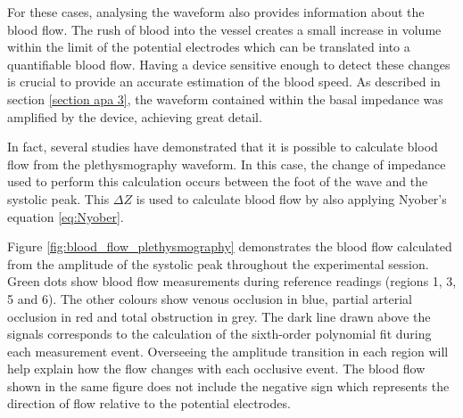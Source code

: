 For these cases, analysing the waveform also provides information about the blood flow.  The rush of blood into the vessel creates a small increase in volume within the limit of the potential electrodes which can be translated into a quantifiable blood flow. Having a device sensitive enough to detect these changes is crucial to provide an accurate estimation of the blood speed. As described in section \ref{section apa 3}, the waveform contained within the basal impedance was amplified by the device, achieving great detail. 

In fact, several studies  have demonstrated that it is possible to calculate blood flow from the plethysmography waveform. In this case, the change of impedance used to perform this calculation occurs between the foot of the wave and the systolic peak. This $\Delta Z$ is used to calculate blood flow by also applying Nyober's equation \ref{eq:Nyober}. 

Figure \ref{fig:blood_flow_plethysmography} demonstrates the blood flow calculated from the amplitude of the systolic peak throughout the experimental session. Green dots show blood flow measurements during reference readings (regions 1, 3, 5 and 6). The other colours show venous occlusion in blue, partial arterial occlusion in red and total obstruction in grey. The dark line drawn above the signals corresponds to the calculation of the sixth-order polynomial fit during each measurement event. Overseeing the amplitude transition in each region will help explain how the flow changes with each occlusive event. The blood flow shown in the same figure does not include the negative sign which represents the direction of flow relative to the potential electrodes.


